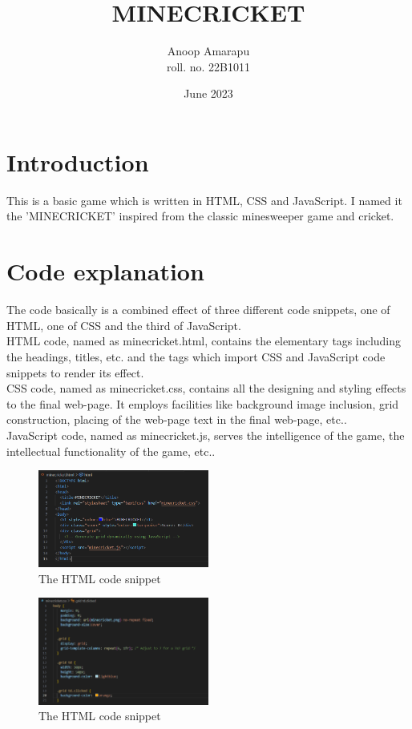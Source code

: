 \documentclass{article}
\title{MINECRICKET}
\author{Anoop Amarapu \\ roll. no. 22B1011}
\date{June 2023}
\begin{document}
\maketitle

\section{Introduction}
This is a basic game which is written in HTML, CSS and JavaScript. I named it the 'MINECRICKET' inspired from the classic minesweeper game and cricket.

\section{Code explanation}
The code  basically is a combined effect of three different code snippets, one of HTML, one of CSS and the third of JavaScript.\\

HTML code, named as minecricket.html, contains the elementary tags including the headings, titles, etc. and the tags which import CSS and JavaScript code snippets to render its effect.\\

CSS code, named as minecricket.css, contains all the designing and styling effects to the final web-page. It employs facilities like background image inclusion, grid construction, placing of the web-page text in the final web-page, etc..\\

JavaScript code, named as minecricket.js, serves the intelligence of the game, the intellectual functionality of the game, etc..\\

\begin{figure}[!ht]
    \centering
    \includegraphics[width=0.5\textwidth]{html.png}
    \caption{The HTML code snippet}
    \label{fig:image}
\end{figure}

\begin{figure}[!ht]
    \centering
    \includegraphics[width=0.5\textwidth]{css.png}
    \caption{The HTML code snippet}
    \label{fig:image}
\end{figure}
\end{document}
